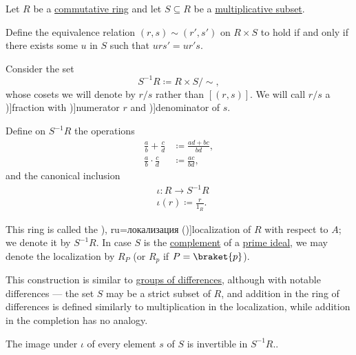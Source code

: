 \begin{definition}\label{def:ring_localization}
  Let \( R \) be a \hyperref[def:ring/commutative]{commutative ring} and let \( S \subseteq R \) be a \hyperref[def:multiplicatively_closed_ring_subset]{multiplicative subset}.

  Define the equivalence relation \( (r, s) \sim (r', s') \) on \( R \times S \) to hold if and only if there exists some \( u \) in \( S \) such that \( u r s' = u r' s \).

  Consider the set
  \begin{equation*}
    S^{-1} R \coloneqq R \times S / {\sim},
  \end{equation*}
  whose cosets we will denote by \( r / s \) rather than \( [(r, s)] \). We will call \( r / s \) a \term[en=fraction (\cite[39]{Bourbaki1998Algebra1to3})]{fraction} with \term[en=numerator (\cite[39]{Bourbaki1998Algebra1to3})]{numerator} \( r \) and \term[en=denominator (\cite[39]{Bourbaki1998Algebra1to3})]{denominator} of \( s \).

  Define on \( S^{-1} R \) the operations
  \begin{align*}
    \frac a b + \frac c d     &\coloneqq \frac {a d + b c} {b d}, \\
    \frac a b \cdot \frac c d &\coloneqq \frac {a c} {b d},
  \end{align*}
  and the canonical inclusion
  \begin{equation*}
    \begin{aligned}
      &\iota: R \to S^{-1} R \\
      &\iota(r) \coloneqq \frac r {1_R}.
    \end{aligned}
  \end{equation*}

  This ring is called the \term[bg=локализация (\cite[23]{КоцевСидеров2016КомутативнаАлгебра}), ru=локализация (\cite[348]{Тыртышников2017ОсновыАлгебры})]{localization} of \( R \) with respect to \( A \); we denote it by \( S^{-1} R \). In case \( S \) is the \hyperref[thm:boolean_algebra_of_subsets/complement]{complement} of a \hyperref[def:semiring_ideal/prime]{prime ideal}, we may denote the localization by \( R_P \) (or \( R_p \) if \( P = \braket{ p } \)).
\end{definition}
\begin{comments}
  \item This construction is similar to \hyperref[def:group_of_differences]{groups of differences}, although with notable differences --- the set \( S \) may be a strict subset of \( R \), and addition in the ring of differences is defined similarly to multiplication in the localization, while addition in the completion has no analogy.

  \item The image under \( \iota \) of every element \( s \) of \( S \) is invertible in \( S^{-1} R \)..
\end{comments}
